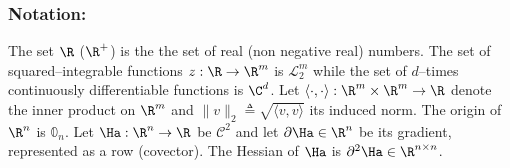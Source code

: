 
%
\subsubsection{Notation:} The set $\R$ ($\R^+$) is the the set of real (non negative real) numbers. The set of squared--integrable functions $z:\R\rightarrow\R^m$ is $\mathcal{L}_2^m$ while the set of $d$--times continuously differentiable functions is $\C^d$. Let $\langle\cdot,\cdot\rangle:\R^m\times\R^m\rightarrow\R$ denote the inner product on $\R^m$ and $\|v\|_2 \triangleq \sqrt{\langle v,v\rangle}$ its induced norm. %
The origin of $\R^n$ is $\mathbb{0}_n$. %
Let $\Ha:\R^n\rightarrow\R$ be $\mathcal{C}^2$ and let $\partial \Ha\in\R^n$ be its gradient, represented as a row (covector). The Hessian of $\Ha$ is $\partial^{2}\Ha \in \R^{n \times n}$.
